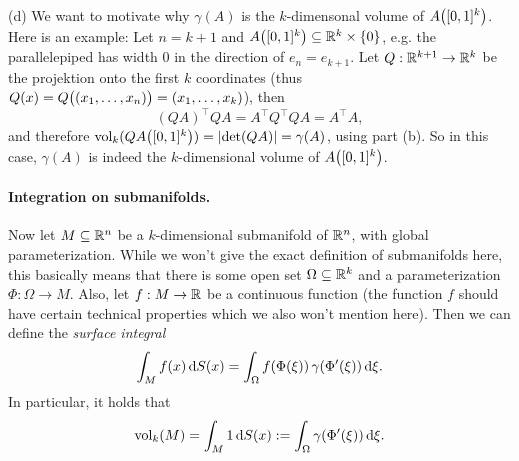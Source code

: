 (d) We want to motivate why $\gamma(A)$ is the $k$-dimensonal volume
of $A\bigl([0,1]^{k}\bigr)$. Here is an example: Let $n=k+1$ and
$A\bigl([0,1]^{k}\bigr)\subseteq\mathbb{R}^{k}\times\{0\}$, e.g. the parallelepiped
has width $0$ in the direction of $e_{n}=e_{k+1}$. Let $Q:\mathbb{R}^{k+1}\to\mathbb{R}^{k}$
be the projektion onto the first $k$ coordinates (thus $Q(x)=Q\bigl((x_{1},\ldots,x_{n})\bigr)=(x_{1},\ldots,x_{k})$),
then\[
(QA)^{\top}QA=A^{\top}Q^{\top}QA=A^{\top}A,\]
and therefore $\operatorname{vol}_{k}(QA\bigl([0,1]^{k}\bigr))=\lvert\det(QA)\rvert=\gamma(A)$,
using part (b). So in this case, $\gamma(A)$ is indeed the $k$-dimensional
volume of $A\bigl([0,1]^{k}\bigr)$.

\medskip{}



\paragraph{Integration on submanifolds.}

Now let $M\subseteq\mathbb{R}^{n}$ be a $k$-dimensional submanifold of $\mathbb{R}^{n}$,
with global parameterization. While we won't give the exact definition
of submanifolds here, this basically means that there is some open
set $\Omega\subseteq\mathbb{R}^{k}$ and a parameterization $\Phi:\Omega\to M$.
Also, let $f:M\to\mathbb{R}$ be a continuous function (the function $f$ should have certain
technical properties which we also won't mention here). Then we can
define the \emph{surface integral}\[
\int_{M}f(x)\,\mathrm{d} S(x)=\int_{\Omega}f(\Phi(\xi))\,\gamma(\Phi'(\xi))\,\mathrm{d}\xi.\]
In particular, it holds that\[
\operatorname{vol}_{k}(M)=\int_{M}1\,\mathrm{d} S(x):=\int_{\Omega}\gamma(\Phi'(\xi))\,\mathrm{d}\xi.\]


